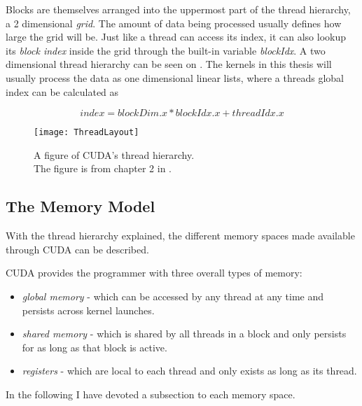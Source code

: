 
Blocks are themselves arranged into the uppermost part of the thread hierarchy,
a 2 dimensional \textit{grid}. The amount of data being processed usually
defines how large the grid will be. Just like a thread can access its index, it
can also lookup its \textit{block index} inside the grid through the built-in
variable \textit{blockIdx}. A two dimensional thread hierarchy can be seen on
. The kernels in this thesis will usually process the
data as one dimensional linear lists, where a threads global index can be
calculated as 

\begin{displaymath}
  index = blockDim.x * blockIdx.x + threadIdx.x
\end{displaymath}

\begin{figure}
  \centering

  \texttt{[image: ThreadLayout]}

  \caption[CUDA's thread hierarchy.]{A figure of CUDA's thread
    hierarchy.\\ The figure is from chapter 2 in .}
  \label{fig:threadLayout}
\end{figure}




\subsection{The Memory Model}\label{sec:memoryModel}

With the thread hierarchy explained, the different memory spaces made available
through CUDA can be described.

CUDA provides the programmer with three overall types of memory:

\begin{itemize}
\item \textit{global memory} - which can be accessed by any thread at any time
  and persists across kernel launches.
\item \textit{shared memory} - which is shared by all threads in a block and
  only persists for as long as that block is active.
\item \textit{registers} - which are local to each thread and only exists as
  long as its thread.
\end{itemize}

In the following I have devoted a subsection to each memory space.


